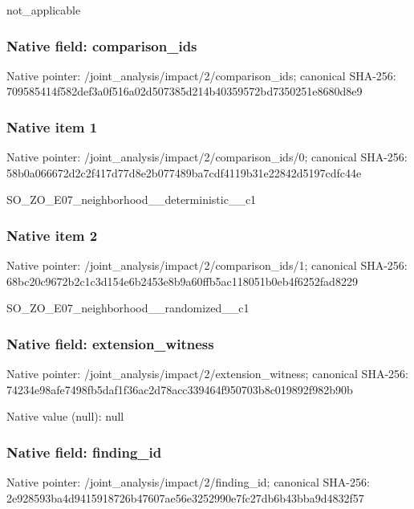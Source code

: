 \documentclass[10pt,a4paper]{article}
\begin{document}
\begingroup\raggedright\sloppy not\_\allowbreak{}applicable\par\endgroup

\subsubsection{Native field: comparison\_\allowbreak{}ids}
Native pointer: /joint\_\allowbreak{}analysis/impact/2/comparison\_\allowbreak{}ids; canonical SHA-256: 709585414f582def3a0f516a02d507385d214b40359572bd7350251e8680d8e9

\subsubsection{Native item 1}
Native pointer: /joint\_\allowbreak{}analysis/impact/2/comparison\_\allowbreak{}ids/0; canonical SHA-256: 58b0a066672d2c2f417d77d8e2b077489ba7cdf4119b31e22842d5197cdfc44e

\begingroup\raggedright\sloppy SO\_\allowbreak{}ZO\_\allowbreak{}E07\_\allowbreak{}neighborhood\_\allowbreak{}\_\allowbreak{}deterministic\_\allowbreak{}\_\allowbreak{}c1\par\endgroup

\subsubsection{Native item 2}
Native pointer: /joint\_\allowbreak{}analysis/impact/2/comparison\_\allowbreak{}ids/1; canonical SHA-256: 68bc20c9672b2c1c3d154e6b2453e8b9a60ffb5ac118051b0eb4f6252fad8229

\begingroup\raggedright\sloppy SO\_\allowbreak{}ZO\_\allowbreak{}E07\_\allowbreak{}neighborhood\_\allowbreak{}\_\allowbreak{}randomized\_\allowbreak{}\_\allowbreak{}c1\par\endgroup

\subsubsection{Native field: extension\_\allowbreak{}witness}
Native pointer: /joint\_\allowbreak{}analysis/impact/2/extension\_\allowbreak{}witness; canonical SHA-256: 74234e98afe7498fb5daf1f36ac2d78acc339464f950703b8c019892f982b90b

Native value (null): null

\subsubsection{Native field: finding\_\allowbreak{}id}
Native pointer: /joint\_\allowbreak{}analysis/impact/2/finding\_\allowbreak{}id; canonical SHA-256: 2e928593ba4d9415918726b47607ae56e3252990e7fc27db6b43bba9d4832f57
\end{document}
